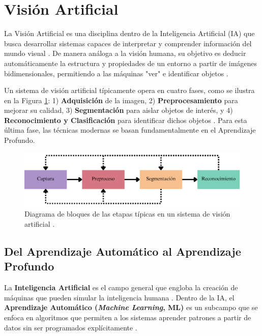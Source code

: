 \section{Visión Artificial}
\label{sec:vision_artificial}

La Visión Artificial es una disciplina dentro de la Inteligencia Artificial (IA) que busca desarrollar sistemas capaces de interpretar y comprender información del mundo visual \cite{szeliski2010computer}. De manera análoga a la visión humana, su objetivo es deducir automáticamente la estructura y propiedades de un entorno a partir de imágenes bidimensionales, permitiendo a las máquinas "ver" e identificar objetos \cite{visionartificialunirioja}.

Un sistema de visión artificial típicamente opera en cuatro fases, como se ilustra en la Figura \ref{fig:proceso_vision}: 1) \textbf{Adquisición} de la imagen, 2) \textbf{Preprocesamiento} para mejorar su calidad, 3) \textbf{Segmentación} para aislar objetos de interés, y 4) \textbf{Reconocimiento y Clasificación} para identificar dichos objetos \cite{visionporcomputador}. Para esta última fase, las técnicas modernas se basan fundamentalmente en el Aprendizaje Profundo.

\begin{figure}[H]
    \centering
    \includegraphics[width=0.8\linewidth]{Documento/Imagenes/Marco Teorico/Dig_blo_VA.pdf}
    \caption{Diagrama de bloques de las etapas típicas en un sistema de visión artificial \cite{visionporcomputador}.}
    \label{fig:proceso_vision}
\end{figure}

\subsection{Del Aprendizaje Automático al Aprendizaje Profundo}
\label{subsec:ml_dl}

La \textbf{Inteligencia Artificial} es el campo general que engloba la creación de máquinas que pueden simular la inteligencia humana \cite{iaunam}. Dentro de la IA, el \textbf{Aprendizaje Automático (\textit{Machine Learning}, ML)} es un subcampo que se enfoca en algoritmos que permiten a los sistemas aprender patrones a partir de datos sin ser programados explícitamente \cite{sanchez2020evaluacion}.

